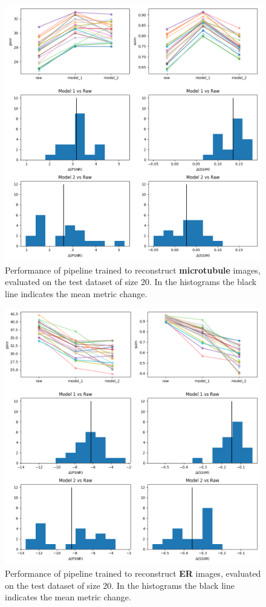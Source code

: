 \documentclass[12pt]{article}
\begin{document}
\begin{figure}[hbtp]
    \includegraphics[scale=0.7, center]{figures/m023_m024_561_pipeline_stats.png}
    \caption{Performance of pipeline trained to reconstruct \textbf{microtubule} images, evaluated on the test dataset of size 20.
    In the histograms the black line indicates the mean metric change.}
    \label{fig:m023_m024_561_pipeline_stats}
\end{figure}

\begin{figure}[hbtp]
    \includegraphics[scale=0.7, center]{figures/m023_m024_488_pipeline_stats.png}
    \caption{Performance of pipeline trained to reconstruct \textbf{ER} images, evaluated on the test dataset of size 20.
    In the histograms the black line indicates the mean metric change.}
    \label{fig:m023_m024_488_pipeline_stats}
\end{figure}
\end{document}
